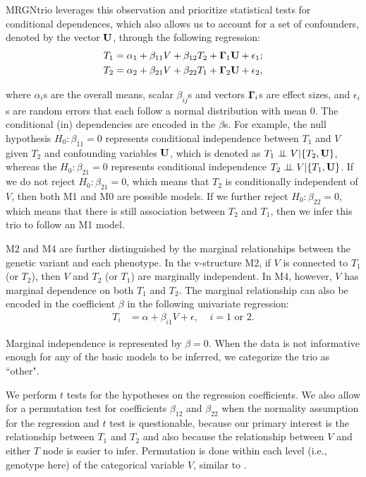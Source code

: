 \documentclass[12pt,letterpaper]{report}
\newcommand{\indep}{\perp \!\!\! \perp}
\begin{document}
\begin{doublespace}
MRGNtrio leverages this observation and prioritize statistical tests for conditional dependences, which also allows us to account for a set of confounders, denoted by the vector ${\bf U}$, through the following regression: 
%
\begin{align}
	T_1 &= \alpha_1 +\beta_{11}V+\beta_{12}T_2+{{\bf \Gamma}_1 {\bf U}}+ \epsilon_1; \label{eq:reg1} \\
	T_2 &= \alpha_2 +\beta_{21}V+\beta_{22}T_1+{{\bf \Gamma}_2 {\bf U}}+ \epsilon_2, \label{eq:reg2}
\end{align}

\hspace{-17pt}where $\alpha_i$s are the overall means, scalar $\beta_{ij}$s and vectors ${\bf \Gamma}_i$s are effect sizes, and $\epsilon_i$s are random errors that each follow a normal distribution with mean 0.  The conditional (in) dependencies are encoded in the $\beta$s.  For example, the null hypothesis $H_0: \beta_{11} = 0$ 
represents conditional independence between $T_1$ and $V$ given $T_2$ and confounding variables ${\bf U}$, which is denoted as $T_1 \indep V | \{T_2, {\bf U} \}$, whereas the $H_0: \beta_{21} = 0$ 
represents conditional independence $T_2 \indep V | \{T_1, {\bf U} \}$.  If we do not reject $H_0: \beta_{21} = 0$, which means that $T_2$ is conditionally independent of $V$, then both M1 and M0 are possible models.  If we further reject $H_0: \beta_{22} = 0$, which means that there is still association between $T_2$ and $T_1$, then we infer this trio to follow an M1 model.

M2 and M4 are further distinguished by the marginal relationships between the genetic variant and each phenotype. In the v-structure M2, if $V$ is connected to $T_1$ (or $T_2$), then $V$ and $T_2$ (or $T_1$) are marginally independent.  In M4, however, $V$ has marginal dependence on both $T_1$ and $T_2$.  The marginal relationship can also be encoded in the coefficient $\beta$ in the following univariate regression:
%
\begin{align}
	T_i &= \alpha + \beta_{i1} V + \epsilon, \;\;\;\; \text{$i = 1$ or 2}. \label{eq:eq3}
\end{align}

\hspace{-9pt} Marginal independence is represented by $\beta=0$. When the data is not informative enough for any of the basic models to be inferred, we categorize the trio as ``other".

We perform $t$ tests for the hypotheses on the regression coefficients. We also allow for a permutation test for coefficients $\beta_{12}$ and $\beta_{22}$ when the normality assumption for the regression and $t$ test is questionable, because our primary interest is the relationship between $T_1$ and $T_2$ and also because the relationship between $V$ and either $T$ node is easier to infer.  Permutation is done within each level (i.e., genotype here) of the categorical variable $V$, similar to \cite{yang2017identifying}. 



\end{doublespace}
\end{document}
